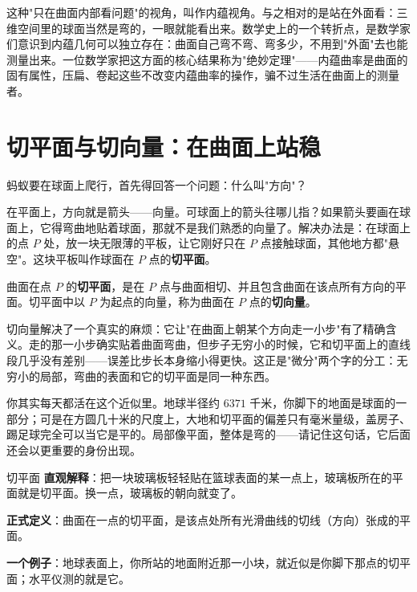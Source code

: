 这种"只在曲面内部看问题"的视角，叫作内蕴视角。与之相对的是站在外面看：三维空间里的球面当然是弯的，一眼就能看出来。数学史上的一个转折点，是数学家们意识到内蕴几何可以独立存在：曲面自己弯不弯、弯多少，不用到"外面"去也能测量出来。一位数学家把这方面的核心结果称为"绝妙定理"——内蕴曲率是曲面的固有属性，压扁、卷起这些不改变内蕴曲率的操作，骗不过生活在曲面上的测量者。

\section{切平面与切向量：在曲面上站稳}

蚂蚁要在球面上爬行，首先得回答一个问题：什么叫"方向"？

在平面上，方向就是箭头——向量。可球面上的箭头往哪儿指？如果箭头要画在球面上，它得弯曲地贴着球面，那就不是我们熟悉的向量了。解决办法是：在球面上的点 $P$ 处，放一块无限薄的平板，让它刚好只在 $P$ 点接触球面，其他地方都"悬空"。这块平板叫作球面在 $P$ 点的\textbf{切平面}。

\begin{center}
\end{center}

\begin{dingyi}
曲面在点 $P$ 的\textbf{切平面}，是在 $P$ 点与曲面相切、并且包含曲面在该点所有方向的平面。切平面中以 $P$ 为起点的向量，称为曲面在 $P$ 点的\textbf{切向量}。
\end{dingyi}

切向量解决了一个真实的麻烦：它让"在曲面上朝某个方向走一小步"有了精确含义。走的那一小步确实贴着曲面弯曲，但步子无穷小的时候，它和切平面上的直线段几乎没有差别——误差比步长本身缩小得更快。这正是"微分"两个字的分工：无穷小的局部，弯曲的表面和它的切平面是同一种东西。

你其实每天都活在这个近似里。地球半径约 $6371$ 千米，你脚下的地面是球面的一部分；可是在方圆几十米的尺度上，大地和切平面的偏差只有毫米量级，盖房子、踢足球完全可以当它是平的。局部像平面，整体是弯的——请记住这句话，它后面还会以更重要的身份出现。

\begin{shuyu}{切平面}
\textbf{直观解释}：把一块玻璃板轻轻贴在篮球表面的某一点上，玻璃板所在的平面就是切平面。换一点，玻璃板的朝向就变了。

\textbf{正式定义}：曲面在一点的切平面，是该点处所有光滑曲线的切线（方向）张成的平面。

\textbf{一个例子}：地球表面上，你所站的地面附近那一小块，就近似是你脚下那点的切平面；水平仪测的就是它。
\end{shuyu}

